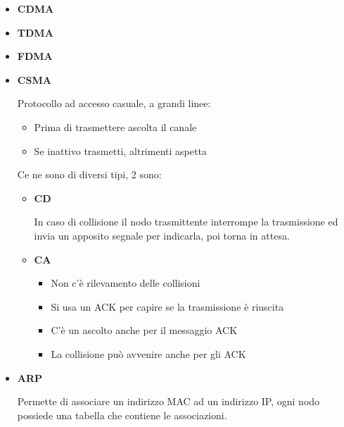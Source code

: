 \documentclass{article}
\begin{document}
\begin{itemize}
\begin{itemize}
            \end{itemize}

        \item \textbf{CDMA}

        \item \textbf{TDMA}

        \item \textbf{FDMA}
                    
        \item \textbf{CSMA}

            Protocollo ad accesso casuale, a grandi linee:
                \begin{itemize}
                    \item Prima di trasmettere ascolta il canale
                    \item Se inattivo trasmetti, altrimenti aspetta
                \end{itemize}
            
                Ce ne sono di diversi tipi, 2 sono:
                    \begin{itemize}
                        \item \textbf{CD}

                            In caso di collisione il nodo trasmittente interrompe la trasmissione ed invia un apposito segnale per indicarla, poi torna in attesa.

                        \item \textbf{CA}

                            \begin{itemize}
                                \item Non c'è rilevamento delle collisioni
                                \item Si usa un ACK per capire se la trasmissione è riuscita
                                \item C'è un ascolto anche per il messaggio ACK
                                \item La collisione può avvenire anche per gli ACK
                            \end{itemize}
                        
                    \end{itemize}

        \item \textbf{ARP}

            Permette di associare un indirizzo MAC ad un indirizzo IP, ogni nodo possiede una tabella che contiene le associazioni.
    
\end{itemize}
\end{document}
